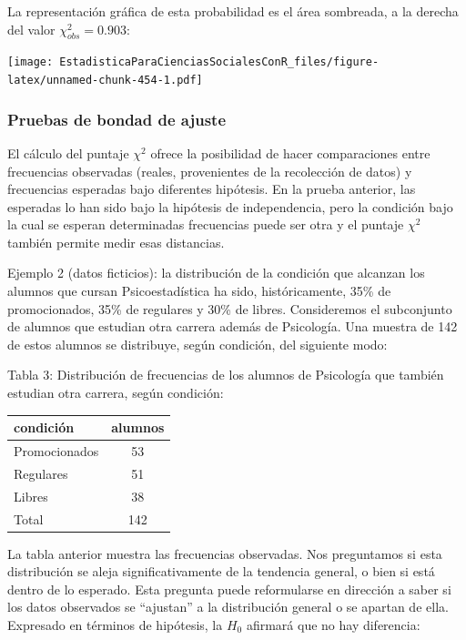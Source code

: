 \documentclass[]{book}
\begin{document}
La representación gráfica de esta probabilidad es el área sombreada, a la derecha del valor \(\chi^2_{obs}=0.903\):

\texttt{[image: EstadisticaParaCienciasSocialesConR\_files/figure-latex/unnamed-chunk-454-1.pdf]}

\hypertarget{pruebas-de-bondad-de-ajuste}{%
\subsubsection{Pruebas de bondad de ajuste}\label{pruebas-de-bondad-de-ajuste}}

El cálculo del puntaje \(\chi^{2}\) ofrece la posibilidad de hacer
comparaciones entre frecuencias observadas (reales, provenientes de la
recolección de datos) y frecuencias esperadas bajo diferentes hipótesis.
En la prueba anterior, las esperadas lo han sido bajo la hipótesis de
independencia, pero la condición bajo la cual se esperan determinadas
frecuencias puede ser otra y el puntaje \(\chi^{2}\) también permite medir
esas distancias.

Ejemplo 2 (datos ficticios): la distribución de la condición que alcanzan
los alumnos que cursan Psicoestadística ha sido, históricamente, 35\% de
promocionados, 35\% de regulares y 30\% de libres. Consideremos el
subconjunto de alumnos que estudian otra carrera además de Psicología.
Una muestra de 142 de estos alumnos se distribuye, según condición, del
siguiente modo:

Tabla 3: Distribución de frecuencias de los alumnos de Psicología que
también estudian otra carrera, según condición:

\begin{table}[H]
\centering
\begin{tabular}{lc}
\toprule
condición & alumnos\\
\midrule
\rowcolor{gray!6}  Promocionados & 53\\
Regulares & 51\\
\rowcolor{gray!6}  Libres & 38\\
Total & 142\\
\bottomrule
\end{tabular}
\end{table}

La tabla anterior muestra las frecuencias observadas. Nos preguntamos si
esta distribución se aleja significativamente de la tendencia general, o
bien si está dentro de lo esperado. Esta pregunta puede reformularse en
dirección a saber si los datos observados se ``ajustan'' a la distribución
general o se apartan de ella. Expresado en términos de hipótesis, la
\(H_0\) afirmará que no hay diferencia:
\end{document}
